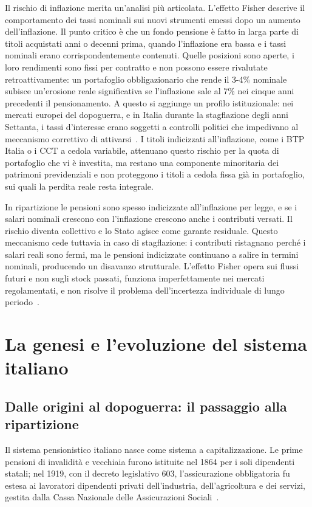 Il rischio di inflazione merita un'analisi più articolata. L'effetto Fisher descrive il comportamento dei tassi nominali sui nuovi strumenti emessi dopo un aumento dell'inflazione. Il punto critico è che un fondo pensione è fatto in larga parte di titoli acquistati anni o decenni prima, quando l'inflazione era bassa e i tassi nominali erano corrispondentemente contenuti. Quelle posizioni sono aperte, i loro rendimenti sono fissi per contratto e non possono essere rivalutate retroattivamente: un portafoglio obbligazionario che rende il 3-4\% nominale subisce un'erosione reale significativa se l'inflazione sale al 7\% nei cinque anni precedenti il pensionamento. A questo si aggiunge un profilo istituzionale: nei mercati europei del dopoguerra, e in Italia durante la stagflazione degli anni Settanta, i tassi d'interesse erano soggetti a controlli politici che impedivano al meccanismo correttivo di attivarsi~\cite{RosenGayerRapallini2023}. I titoli indicizzati all'inflazione, come i BTP Italia o i CCT a cedola variabile, attenuano questo rischio per la quota di portafoglio che vi è investita, ma restano una componente minoritaria dei patrimoni previdenziali e non proteggono i titoli a cedola fissa già in portafoglio, sui quali la perdita reale resta integrale.

In ripartizione le pensioni sono spesso indicizzate all'inflazione per legge, e se i salari nominali crescono con l'inflazione crescono anche i contributi versati. Il rischio diventa collettivo e lo Stato agisce come garante residuale. Questo meccanismo cede tuttavia in caso di stagflazione: i contributi ristagnano perché i salari reali sono fermi, ma le pensioni indicizzate continuano a salire in termini nominali, producendo un disavanzo strutturale. L'effetto Fisher opera sui flussi futuri e non sugli stock passati, funziona imperfettamente nei mercati regolamentati, e non risolve il problema dell'incertezza individuale di lungo periodo~\cite{RosenGayerRapallini2023}.

\section{La genesi e l'evoluzione del sistema italiano}

\subsection{Dalle origini al dopoguerra: il passaggio alla ripartizione}

Il sistema pensionistico italiano nasce come sistema a capitalizzazione. Le prime pensioni di invalidità e vecchiaia furono istituite nel 1864 per i soli dipendenti statali; nel 1919, con il decreto legislativo 603, l'assicurazione obbligatoria fu estesa ai lavoratori dipendenti privati dell'industria, dell'agricoltura e dei servizi, gestita dalla Cassa Nazionale delle Assicurazioni Sociali~\cite{CERP2008}.

